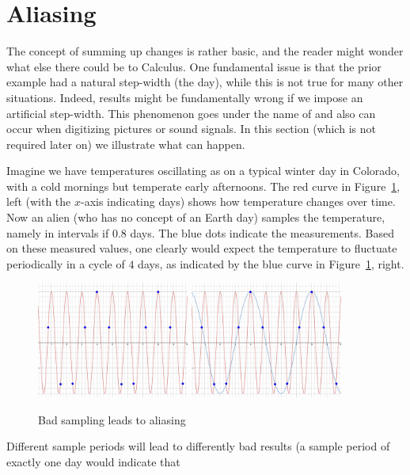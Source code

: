\section{Aliasing}

The concept of summing up changes is rather basic, and the reader might
wonder what else there could be to Calculus. One fundamental issue is that
the prior example had a natural step-width (the day), while this is not true
for many other situations. Indeed, results might be fundamentally wrong if
we impose an artificial step-width. This phenomenon goes under the name of
 and also can occur when digitizing pictures or sound
signals. In this section (which is not required later on) we illustrate what
can happen.
\smallskip

Imagine we  have temperatures oscillating as on a typical winter day in
Colorado, with a cold mornings but temperate early afternoons. The red curve
in Figure~\ref{figalias}, left (with the $x$-axis indicating days) shows
how temperature changes over time. Now an alien (who has no concept of an
Earth day) samples the temperature, namely in intervals if $0.8$ days. The
blue dots indicate the measurements. Based on these measured values, one
clearly would expect the temperature to fluctuate periodically in a cycle of
$4$ days, as indicated by the blue curve in Figure~\ref{figalias}, right.
\begin{figure}
\begin{center}
\includegraphics[width=5cm]{pic/Aliasing1.pdf}
\quad
\includegraphics[width=5cm]{pic/Aliasing2.pdf}
\end{center}
\caption{Bad sampling leads to aliasing}
\label{figalias}
\end{figure}
Different sample periods will lead to differently bad results (a sample
period of exactly one day would indicate that 

